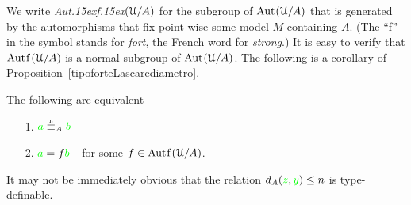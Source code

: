 We write \emph{Aut\kern.15ex{f}\kern.15ex$(\EuScript U/A)$\/} for the subgroup of ${\rm Aut\kern.15ex}(\EuScript U/A)$ that is generated by the automorphisms that fix point-wise some model $M$ containing $A$.
(The ``f'' in the symbol stands for \textit{fort\/}, the French word for \textit{strong}.) It is easy to verify that $\mathord{\rm Aut\kern.15ex{f}\kern.15ex}(\EuScript U/A)$ is a normal subgroup of ${\rm Aut\kern.15ex}(\EuScript U/A)$.
The following is a corollary of Proposition~\ref{tipoforteLascarediametro}. 

\begin{corollary}
The following are equivalent
\begin{itemize}
 \item[1.] ${\gr a}\equivL_A{\gr b}$
 \item[2.] ${\color{green} a}=f{\color{green} b}$\ \ for some $f\in\mathord{\rm Aut\kern.15ex{f}\kern.15ex}(\EuScript U/A)$.
\end{itemize}
\end{corollary}

% 

It may not be immediately obvious that the relation $d_A({\color{green} z},{\color{green} y})\le n$ is type-definable.

